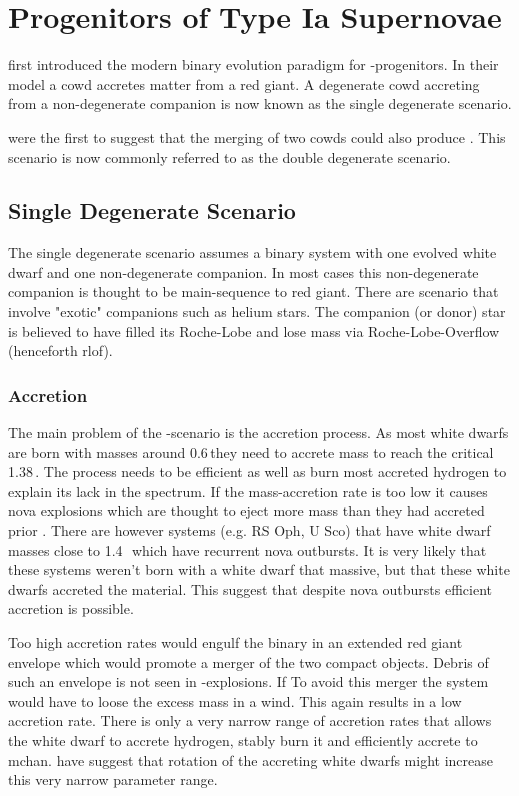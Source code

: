 \section{Progenitors of Type Ia Supernovae}
\label{sec:snia_progenitor}

\citet{1973ApJ...186.1007W} first introduced the modern binary evolution paradigm for \snia-progenitors. In their model a \gls{cowd} accretes matter from a red giant. A degenerate \gls{cowd} accreting from a non-degenerate companion is now known as the single degenerate scenario. 

\citet{1984ApJ...277..355W, 1984ApJS...54..335I} were the first to suggest that the merging of two \glspl{cowd} could also produce \sneia. This scenario is now commonly referred to as the double degenerate scenario.



\subsection{Single Degenerate Scenario}
The single degenerate scenario assumes a binary system with one evolved white dwarf and one non-degenerate companion. In most cases this non-degenerate companion is thought to be main-sequence to red giant. There are scenario that involve "exotic" companions such as helium stars. The companion (or donor) star is believed to have filled its Roche-Lobe and lose mass via Roche-Lobe-Overflow (henceforth \gls{rlof}).

\subsubsection{Accretion}
The main problem of the \sd-scenario is the accretion process.  As most white dwarfs are born with masses around 0.6\,\msun they need to accrete mass to reach the critical 1.38\,\msun. The process needs to be efficient as well as burn most accreted hydrogen to explain its lack in the spectrum.
 If the mass-accretion rate is too low it causes nova explosions which are thought to eject more mass than they had accreted prior \citep{Nomoto:1982p451}. There are however systems (e.g. RS Oph, U Sco) that have white dwarf masses close to 1.4\,\msun\ which have recurrent nova outbursts. It is very likely that these systems weren't born with a white dwarf that massive, but that these white dwarfs accreted the material. This suggest that despite nova outbursts efficient accretion is possible. 
 
 Too high accretion rates would engulf the binary in an extended red giant envelope which would promote a merger of the two compact objects. Debris of such an envelope is not seen in \snia-explosions. If To avoid this merger the system would have to loose the excess mass in a wind. This again results in a low accretion rate. There is only a very narrow range of accretion rates that allows the white dwarf to accrete hydrogen, stably burn it and efficiently accrete to \gls{mchan}. \cite{2004A&A...419..623Y} have suggest that rotation of the accreting white dwarfs might increase this very narrow parameter range.
 
